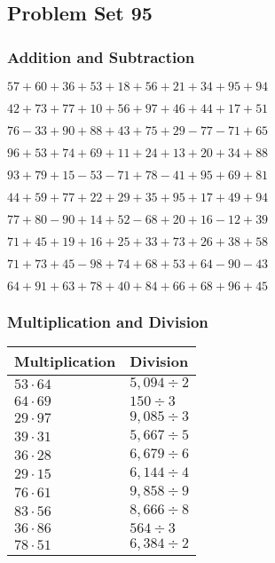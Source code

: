 \hypertarget{problem-set-95}{%
\subsection{Problem Set 95}\label{problem-set-95}}

\hypertarget{addition-and-subtraction}{%
\subsubsection{Addition and
Subtraction}\label{addition-and-subtraction}}

\(57+60+36+53+18+56+21+34+95+94\)

\(42+73+77+10+56+97+46+44+17+51\)

\(76-33+90+88+43+75+29-77-71+65\)

\(96+53+74+69+11+24+13+20+34+88\)

\(93+79+15-53-71+78-41+95+69+81\)

\(44+59+77+22+29+35+95+17+49+94\)

\(77+80-90+14+52-68+20+16-12+39\)

\(71+45+19+16+25+33+73+26+38+58\)

\(71+73+45-98+74+68+53+64-90-43\)

\(64+91+63+78+40+84+66+68+96+45\)

\hypertarget{multiplication-and-division}{%
\subsubsection{Multiplication and
Division}\label{multiplication-and-division}}

\begin{longtable}[]{@{}ll@{}}
\toprule
Multiplication & Division\tabularnewline
\midrule
\endhead
\(53\cdot64\) & \(5,094÷2\)\tabularnewline
\(64\cdot69\) & \(150÷3\)\tabularnewline
\(29\cdot97\) & \(9,085÷3\)\tabularnewline
\(39\cdot31\) & \(5,667÷5\)\tabularnewline
\(36\cdot28\) & \(6,679÷6\)\tabularnewline
\(29\cdot15\) & \(6,144÷4\)\tabularnewline
\(76\cdot61\) & \(9,858÷9\)\tabularnewline
\(83\cdot56\) & \(8,666÷8\)\tabularnewline
\(36\cdot86\) & \(564÷3\)\tabularnewline
\(78\cdot51\) & \(6,384÷2\)\tabularnewline
\bottomrule
\end{longtable}
